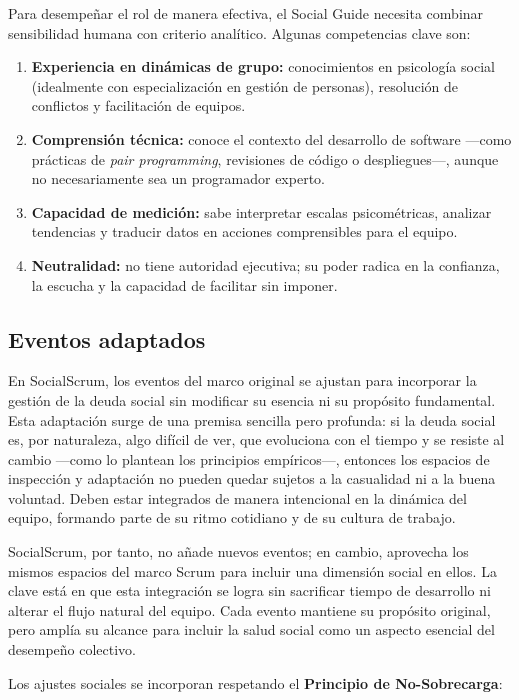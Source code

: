 Para desempeñar el rol de manera efectiva, el Social Guide necesita combinar sensibilidad humana con criterio analítico. Algunas competencias clave son:

\begin{enumerate}
    \item \textbf{Experiencia en dinámicas de grupo:} conocimientos en psicología social (idealmente con especialización en gestión de personas), resolución de conflictos y facilitación de equipos.
    \item \textbf{Comprensión técnica:} conoce el contexto del desarrollo de software —como prácticas de \textit{pair programming}, revisiones de código o despliegues—, aunque no necesariamente sea un programador experto.
    \item \textbf{Capacidad de medición:} sabe interpretar escalas psicométricas, analizar tendencias y traducir datos en acciones comprensibles para el equipo.
    \item \textbf{Neutralidad:} no tiene autoridad ejecutiva; su poder radica en la confianza, la escucha y la capacidad de facilitar sin imponer.
\end{enumerate}

\subsection{Eventos adaptados}

En SocialScrum, los eventos del marco original se ajustan para incorporar la gestión de la deuda social sin modificar su esencia ni su propósito fundamental. Esta adaptación surge de una premisa sencilla pero profunda: si la deuda social es, por naturaleza, algo difícil de ver, que evoluciona con el tiempo y se resiste al cambio —como lo plantean los principios empíricos—, entonces los espacios de inspección y adaptación no pueden quedar sujetos a la casualidad ni a la buena voluntad. Deben estar integrados de manera intencional en la dinámica del equipo, formando parte de su ritmo cotidiano y de su cultura de trabajo.

SocialScrum, por tanto, no añade nuevos eventos; en cambio, aprovecha los mismos espacios del marco Scrum para incluir una dimensión social en ellos.
La clave está en que esta integración se logra sin sacrificar tiempo de desarrollo ni alterar el flujo natural del equipo. Cada evento mantiene su propósito original, pero amplía su alcance para incluir la salud social como un aspecto esencial del desempeño colectivo.

Los ajustes sociales se incorporan respetando el \textbf{Principio de No-Sobrecarga}:

